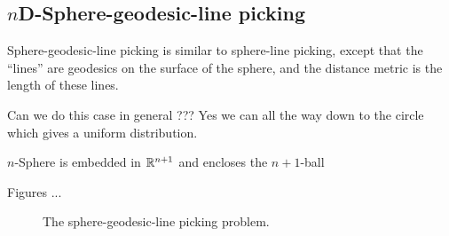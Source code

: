 \subsection{$n$D-Sphere-geodesic-line picking}
\label{sec:nsphere_geodesic_line}

Sphere-geodesic-line picking is similar to sphere-line picking, except
that the ``lines'' are geodesics on the surface of the sphere, and the
distance metric is the length of these lines.

Can we do this case in general ??? Yes we can all the way down to the circle which gives a uniform distribution.

$n$-Sphere is embedded in $\mathbb{R}^{n+1}$ and encloses the $n+1$-ball


Figures ...

\begin{figure}[tbp]
  \begin{center}
    \hspace{6mm}
    \caption{The sphere-geodesic-line picking problem.}
  \end{center} 
\vspace{-4mm}
\end{figure}



